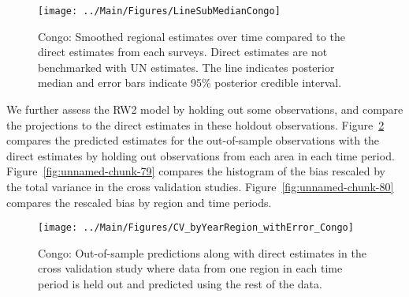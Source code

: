 \documentclass[12pt]{article}\usepackage[]{graphicx}\usepackage[]{color}
\newenvironment{knitrout}{}{} %
\begin{document}
\begin{knitrout}
\color{fgcolor}\begin{figure}[bht]

{\centering \texttt{[image: ../Main/Figures/LineSubMedianCongo]} 

}

\caption[Congo]{Congo: Smoothed regional estimates over time compared to the direct estimates from each surveys. Direct estimates are not benchmarked with UN estimates. The line indicates posterior median and error bars indicate 95\% posterior credible interval.}\label{fig:unnamed-chunk-77}
\end{figure}


\end{knitrout}
We further assess the RW2 model by holding out some observations, and compare the projections to the direct estimates in these holdout observations. Figure~\ref{fig:unnamed-chunk-78} compares the predicted estimates for the out-of-sample observations  with the direct estimates by holding out observations from each area in each time period.  Figure~\ref{fig:unnamed-chunk-79} compares the histogram of the bias rescaled by the total variance in the cross validation studies. Figure~\ref{fig:unnamed-chunk-80} compares the rescaled bias by region and time periods.



 
\begin{knitrout}
\color{fgcolor}\begin{figure}[bht]

{\centering \texttt{[image: ../Main/Figures/CV\_byYearRegion\_withError\_Congo]} 

}

\caption[Congo]{Congo: Out-of-sample predictions along with direct estimates in the cross validation study where data from one region in each time period is held out and predicted using the rest of the data.}\label{fig:unnamed-chunk-78}
\end{figure}


\end{knitrout}
\end{document}
